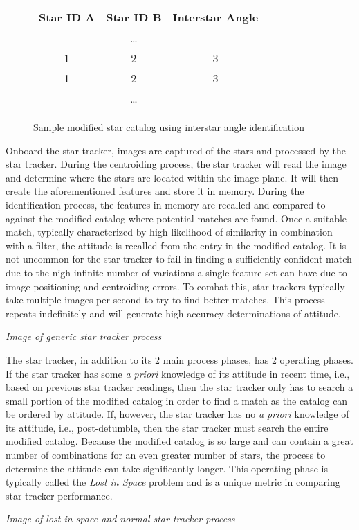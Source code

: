 \begin{figure}
    \begin{adjustbox}{center}
\begin{tabular}{|| c c c ||}
    \hline
    Star ID A & Star ID B & Interstar Angle \\
    \hline\hline

    & \dots & \\ 
    \hline
    1 & 2 & 3 \\
    \hline
    1 & 2 & 3 \\
    \hline
    & \dots & \\ 
    \hline


\end{tabular}
\end{adjustbox}
\caption{Sample modified star catalog using interstar angle identification}
\end{figure}

\par \qquad Onboard the star tracker, images are captured of the stars and processed by the star tracker.
During the centroiding process, the star tracker will read the image and determine where the stars are located within the image plane.
It will then create the aforementioned features and store it in memory.
During the identification process, the features in memory are recalled and compared to against the modified catalog where potential matches are found.
Once a suitable match, typically characterized by high likelihood of similarity in combination with a filter, the attitude is recalled from the entry in the modified catalog.
It is not uncommon for the star tracker to fail in finding a sufficiently confident match due to the nigh-infinite number of variations a single feature set can have due to image positioning and centroiding errors.
To combat this, star trackers typically take multiple images per second to try to find better matches.
This process repeats indefinitely and will generate high-accuracy determinations of attitude.

\par \qquad \emph{Image of generic star tracker process}

\par \qquad The star tracker, in addition to its 2 main process phases, has 2 operating phases.
If the star tracker has some \emph{a priori} knowledge of its attitude in recent time, i.e., based on previous star tracker readings, then the star tracker only has to search a small portion of the modified catalog in order to find a match as the catalog can be ordered by attitude.
If, however, the star tracker has no \emph{a priori} knowledge of its attitude, i.e., post-detumble, then the star tracker must search the entire modified catalog.
Because the modified catalog is so large and can contain a great number of combinations for an even greater number of stars, the process to determine the attitude can take significantly longer.
This operating phase is typically called the \emph{Lost in Space} problem and is a unique metric in comparing star tracker performance.

\par \qquad \emph{Image of lost in space and normal star tracker process}